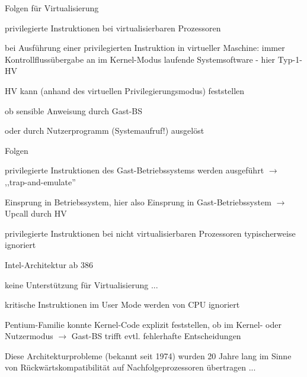 \documentclass[a4paper]{article}
\begin{document}
\begin{multicols}{3}
    Folgen für Virtualisierung
    \begin{itemize*}
        \item privilegierte Instruktionen bei virtualisierbaren Prozessoren
        \item bei Ausführung einer privilegierten Instruktion in virtueller Maschine: immer Kontrollflussübergabe an im Kernel-Modus laufende Systemsoftware - hier Typ-1-HV
        \item HV kann (anhand des virtuellen Privilegierungsmodus) feststellen
        \begin{enumerate*}
            \item ob sensible Anweisung durch Gast-BS
            \item oder durch Nutzerprogramm (Systemaufruf!) ausgelöst
        \end{enumerate*}
        \item Folgen
        \begin{enumerate*}
            \item privilegierte Instruktionen des Gast-Betriebssystems werden ausgeführt $\rightarrow$ ,,trap-and-emulate''
            \item Einsprung in Betriebssystem, hier also Einsprung in Gast-Betriebssystem $\rightarrow$ Upcall durch HV
        \end{enumerate*}
        \item privilegierte Instruktionen bei nicht virtualisierbaren Prozessoren typischerweise ignoriert
    \end{itemize*}

    Intel-Architektur ab 386
    \begin{itemize*}
        \item keine Unterstützung für Virtualisierung ...
        \item kritische Instruktionen im User Mode werden von CPU ignoriert
        \item Pentium-Familie konnte Kernel-Code explizit feststellen, ob im Kernel- oder Nutzermodus $\rightarrow$ Gast-BS trifft evtl. fehlerhafte Entscheidungen
        \item Diese Architekturprobleme (bekannt seit 1974) wurden 20 Jahre lang im Sinne von Rückwärtskompatibilität auf Nachfolgeprozessoren übertragen ...
    \end{itemize*}


\end{multicols}
\end{document}
